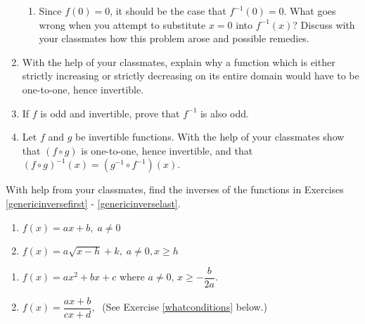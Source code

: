 \begin{enumerate}
\begin{enumerate}
\item  Since $f(0) = 0$, it should be the case that $f^{-1}(0) = 0$.  What goes wrong when you attempt to substitute $x=0$ into $f^{-1}(x)$?  Discuss with your classmates how this problem arose and possible remedies.

\end{enumerate}

\item With the help of your classmates, explain why a function which is either strictly increasing or strictly decreasing on its entire domain would have to be one-to-one, hence invertible.

\item If $f$ is odd and invertible, prove that $f^{-1}$ is also odd.

\item \label{fcircginverse} Let $f$ and $g$ be invertible functions.  With the help of your classmates show that $(f \circ g)$ is one-to-one, hence invertible, and that $(f \circ g)^{-1}(x) = (g^{-1} \circ f^{-1})(x)$.

\setcounter{HW}{\value{enumi}}
\end{enumerate}

With help from your classmates, find the inverses of the functions in Exercises \ref{genericinversefirst} - \ref{genericinverselast}.

\begin{multicols}{2}
\begin{enumerate}
\setcounter{enumi}{\value{HW}}

\item $f(x) = ax + b, \; a \neq 0$ \label{genericinversefirst}
\item $f(x) = a\sqrt{x - h} + k, \; a \neq 0, x \geq h$


\setcounter{HW}{\value{enumi}}
\end{enumerate}
\end{multicols}

\begin{multicols}{2}
\begin{enumerate}
\setcounter{enumi}{\value{HW}}
\item $f(x) = ax^{2} + bx + c$ where $a \neq 0, \, x \geq -\dfrac{b}{2a}$.

\item $f(x) = \dfrac{ax + b}{cx + d},\;$ (See Exercise \ref{whatconditions} below.) \label{genericinverselast}

\setcounter{HW}{\value{enumi}}
\end{enumerate}
\end{multicols}

